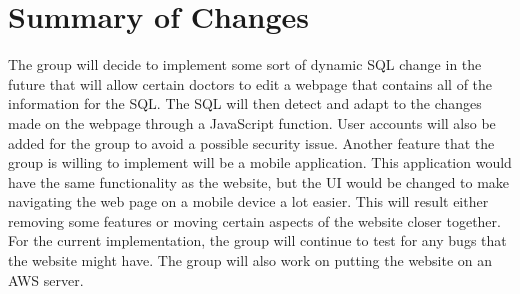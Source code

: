 \documentclass[12pt]{article}
\begin{document}
\section{Summary of Changes}
The group will decide to implement some sort of dynamic SQL change in the future that will allow certain doctors to edit a webpage that contains all of the information for the SQL. The SQL will then detect and adapt to the changes made on the webpage through a JavaScript function. User accounts will also be added for the group to avoid a possible security issue. Another feature that the group is willing to implement will be a mobile application. This application would have the same functionality as the website, but the UI would be changed to make navigating the web page on a mobile device a lot easier. This will result either removing some features or moving certain aspects of the website closer together. For the current implementation, the group will continue to test for any bugs that the website might have. The group will also work on putting the website on an AWS server.
\end{document}
